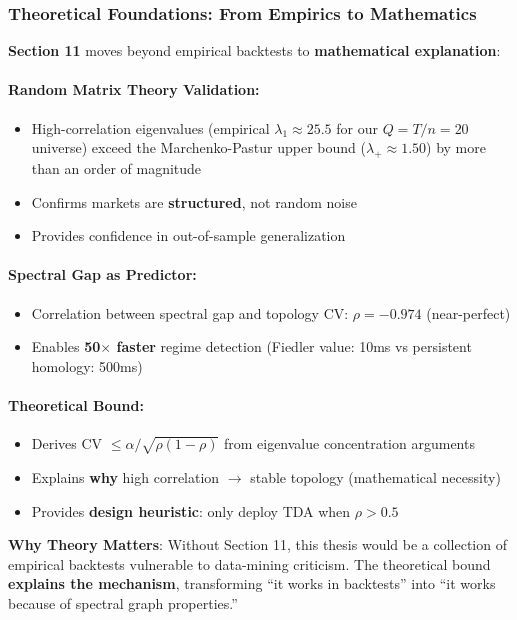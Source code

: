 \subsubsection{Theoretical Foundations: From Empirics to Mathematics}

\textbf{Section 11} moves beyond empirical backtests to \textbf{mathematical explanation}:

\paragraph{Random Matrix Theory Validation:}
\begin{itemize}
\item High-correlation eigenvalues (empirical $\lambda_1 \approx 25.5$ for our $Q = T/n = 20$ universe) exceed the Marchenko-Pastur upper bound ($\lambda_+ \approx 1.50$) by more than an order of magnitude
\item Confirms markets are \textbf{structured}, not random noise
\item Provides confidence in out-of-sample generalization
\end{itemize}

\paragraph{Spectral Gap as Predictor:}
\begin{itemize}
\item Correlation between spectral gap and topology CV: $\rho = -0.974$ (near-perfect)
\item Enables \textbf{50$\times$ faster} regime detection (Fiedler value: 10ms vs persistent homology: 500ms)
\end{itemize}

\paragraph{Theoretical Bound:}
\begin{itemize}
\item Derives CV $\leq \alpha/\sqrt{\rho(1-\rho)}$ from eigenvalue concentration arguments
\item Explains \textbf{why} high correlation $\rightarrow$ stable topology (mathematical necessity)
\item Provides \textbf{design heuristic}: only deploy TDA when $\rho > 0.5$
\end{itemize}

\textbf{Why Theory Matters}: Without Section 11, this thesis would be a collection of empirical backtests vulnerable to data-mining criticism. The theoretical bound \textbf{explains the mechanism}, transforming ``it works in backtests'' into ``it works because of spectral graph properties.''

